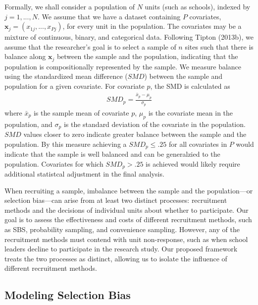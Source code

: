\documentclass[english,man,floatsintext]{apa6}
\begin{document}
Formally, we shall consider a population of \(N\) units (such as schools), indexed by \(j = 1,...,N\).
We assume that we have a dataset containing \(P\) covariates, \(\mathbf{x}_j = \left(x_{1j},...,x_{Pj}\right)\), for every unit in the population. The covariates may be a mixture of continuous, binary, and categorical data.
Following Tipton (2013b), we assume that the researcher's goal is to select a sample of \(n\) sites such that there is balance along \(\mathbf{x}_j\) between the sample and the population, indicating that the population is compositionally represented by the sample.
We measure balance using the standardized mean difference (\(SMD\)) between the sample and population for a given covariate. For covariate \(p\), the SMD is calculated as
\begin{align} \label{eq:SMD}
SMD_p = \frac{\bar{x}_p - \mu_p}{\sigma_p}
\end{align}
where \(\bar{x}_p\) is the sample mean of covariate \(p\), \(\mu_p\) is the covariate mean in the population, and \(\sigma_p\) is the standard deviation of the covariate in the population. \(SMD\) values closer to zero indicate greater balance between the sample and the population. By this measure achieving a \(SMD_p \le .25\) for all covariates in \(P\) would indicate that the sample is well balanced and can be generalzied to the population. Covariates for which \(SMD_p > .25\) is achieved would likely require additional statistcal adjustment in the final analysis.  

When recruiting a sample, imbalance between the sample and the population---or selection bias---can arise from at least two distinct processes: recruitment methods and the decisions of individual units about whether to participate. Our goal is to assess the effectiveness and costs of different recruitment methods, such as SBS, probability sampling, and convenience sampling. However, any of the recruitment methods must contend with unit non-response, such as when school leaders decline to participate in the research study.
Our proposed framework treats the two processes as distinct, allowing us to isolate the influence of different recruitment methods.

\hypertarget{modeling-selection-bias}{%
\subsection{Modeling Selection Bias}\label{modeling-selection-bias}}
\end{document}
